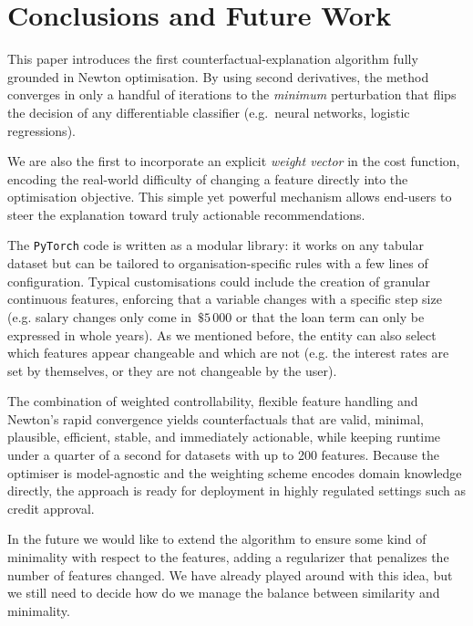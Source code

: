 \documentclass[12pt]{extarticle}
\numberwithin{equation}{section}
\begin{document}
\section{Conclusions and Future Work}\label{sec:conclusion}

This paper introduces the first counterfactual-explanation algorithm fully grounded in Newton optimisation.  
By using second derivatives, the method converges in only a handful of iterations to the \emph{minimum} perturbation that flips the decision of any differentiable classifier (e.g.\ neural networks, logistic regressions).  

We are also the first to incorporate an explicit \emph{weight vector} in the cost function, encoding the real-world difficulty of changing a feature directly into the optimisation objective. This simple yet powerful mechanism allows end-users to steer the explanation toward truly actionable recommendations.

The \texttt{PyTorch} code is written as a modular library: it works on any tabular dataset but can be tailored to organisation-specific rules with a few lines of configuration. Typical customisations could include the creation of granular continuous features, enforcing that a variable changes with a specific step size (e.g. salary changes only come in \(\,\$5\,000\) or that the loan term can only be expressed in whole years). As we mentioned before, the entity can also select which features appear changeable and which are not (e.g. the interest rates are set by themselves, or they are not changeable by the user).

The combination of weighted controllability, flexible feature handling and Newton's rapid convergence yields counterfactuals that are valid, minimal, plausible, efficient, stable, and immediately actionable, while keeping runtime under a quarter of a second for datasets with up to 200 features. Because the optimiser is model-agnostic and the weighting scheme encodes domain knowledge directly, the approach is ready for deployment in highly regulated settings such as credit approval.

In the future we would like to extend the algorithm to ensure some kind of minimality with respect to the features, adding a regularizer that penalizes the number of features changed. We have already played around with this idea, but we still need to decide how do we manage the balance between similarity and minimality. 
\end{document}
